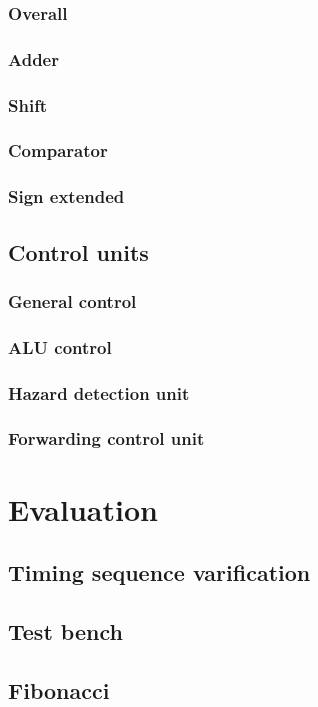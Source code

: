 \documentclass[11pt, a4paper, twoside]{IEEEtran}
\begin{document}
		\subsubsection{Overall}
		\subsubsection{Adder}
		\subsubsection{Shift}
		\subsubsection{Comparator}
		\subsubsection{Sign extended}
	\subsection{Control units}
		\subsubsection{General control}
		\subsubsection{ALU control}
		\subsubsection{Hazard detection unit}
		\subsubsection{Forwarding control unit}
		
\section{Evaluation}
	\subsection{Timing sequence varification}
	\subsection{Test bench}
	\subsection{Fibonacci}
	
\end{document}
